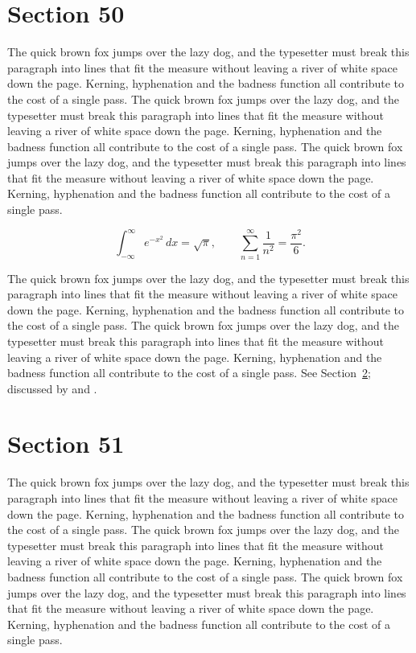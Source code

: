 \documentclass{article}
\begin{document}
\section{Section 50}
\label{sec:50}
The quick brown fox jumps over the lazy dog, and the typesetter must break this paragraph into lines that fit the measure without leaving a river of white space down the page. Kerning, hyphenation and the badness function all contribute to the cost of a single pass. The quick brown fox jumps over the lazy dog, and the typesetter must break this paragraph into lines that fit the measure without leaving a river of white space down the page. Kerning, hyphenation and the badness function all contribute to the cost of a single pass. The quick brown fox jumps over the lazy dog, and the typesetter must break this paragraph into lines that fit the measure without leaving a river of white space down the page. Kerning, hyphenation and the badness function all contribute to the cost of a single pass. 

\begin{equation}\label{eq:50}
\int_{-\infty}^{\infty} e^{-x^{2}}\,dx = \sqrt{\pi}, \qquad
\sum_{n=1}^{\infty} \frac{1}{n^{2}} = \frac{\pi^{2}}{6}.
\end{equation}

The quick brown fox jumps over the lazy dog, and the typesetter must break this paragraph into lines that fit the measure without leaving a river of white space down the page. Kerning, hyphenation and the badness function all contribute to the cost of a single pass. The quick brown fox jumps over the lazy dog, and the typesetter must break this paragraph into lines that fit the measure without leaving a river of white space down the page. Kerning, hyphenation and the badness function all contribute to the cost of a single pass. 
See Section~\ref{sec:51}; discussed by \textcite{k1} and \textcite{l3}.
\section{Section 51}
\label{sec:51}
The quick brown fox jumps over the lazy dog, and the typesetter must break this paragraph into lines that fit the measure without leaving a river of white space down the page. Kerning, hyphenation and the badness function all contribute to the cost of a single pass. The quick brown fox jumps over the lazy dog, and the typesetter must break this paragraph into lines that fit the measure without leaving a river of white space down the page. Kerning, hyphenation and the badness function all contribute to the cost of a single pass. The quick brown fox jumps over the lazy dog, and the typesetter must break this paragraph into lines that fit the measure without leaving a river of white space down the page. Kerning, hyphenation and the badness function all contribute to the cost of a single pass. 
\end{document}
